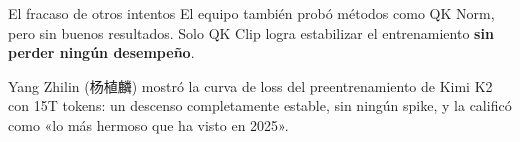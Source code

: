 \begin{warningbox}{El fracaso de otros intentos}
El equipo también probó métodos como QK Norm, pero sin buenos resultados. Solo QK Clip logra estabilizar el entrenamiento \textbf{sin perder ningún desempeño}.
\end{warningbox}

Yang Zhilin (杨植麟) mostró la curva de loss del preentrenamiento de Kimi K2 con 15T tokens: un descenso completamente estable, sin ningún spike, y la calificó como «lo más hermoso que ha visto en 2025».

